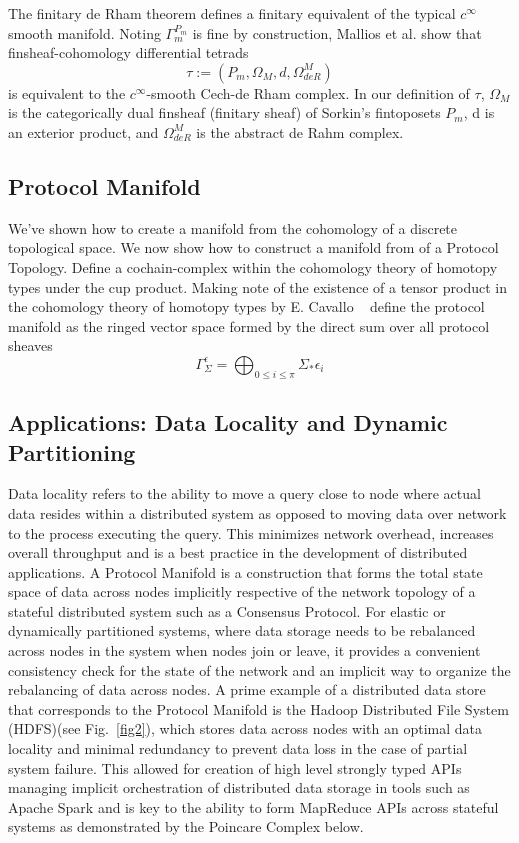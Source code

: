 \documentclass[runningheads]{llncs}
\begin{document}
The finitary de Rham theorem defines a finitary equivalent of the typical $c^{\infty}$ smooth manifold. Noting $\Gamma^{P_m}_m$ is fine by construction, Mallios et al. show that finsheaf-cohomology differential tetrads
\begin{equation}
\tau := (P_m, \Omega_M, d, \Omega^M_{deR})
\end{equation}
is equivalent to the $c^{\infty}$-smooth Cech-de Rham complex. In our definition of $\tau$, $\Omega_M$ is the categorically dual finsheaf (finitary sheaf) of Sorkin's  fintoposets $P_m$, d is an exterior product, and $ \Omega^M_{deR}$ is the abstract de Rahm complex.

\subsection{Protocol Manifold}
We've shown how to create a manifold from the cohomology of a discrete topological space. We now show how to construct a manifold from of a Protocol Topology. Define a cochain-complex within the cohomology theory of homotopy types under the cup product. Making note of the existence of a tensor product in the cohomology theory of homotopy types by E. Cavallo ~\cite{ref_article9} define the protocol manifold as the ringed vector space formed by the direct sum over all protocol sheaves
\begin{equation}
\Gamma^\epsilon_{\Sigma} = \bigoplus_{0 \leq i \leq \pi} \Sigma_* \epsilon_i
\end{equation}

\subsection{Applications: Data Locality and Dynamic Partitioning}
Data locality refers to the ability to move a query close to node where actual data resides within a distributed system as opposed to moving data over network to the process executing the query. This minimizes network overhead, increases overall throughput and is a best practice in the development of distributed applications. A Protocol Manifold is a construction that forms the total state space of data across nodes implicitly respective of the network topology of a stateful distributed system such as a Consensus Protocol. For elastic or dynamically partitioned systems, where data storage needs to be rebalanced across nodes in the system when nodes join or leave, it provides a convenient consistency check for the state of the network and an implicit way to organize the rebalancing of data across nodes. A prime example of a distributed data store that corresponds to the Protocol Manifold is the Hadoop Distributed File System (HDFS)(see Fig.~\ref{fig2}), which stores data across nodes with an optimal data locality and minimal redundancy to prevent data loss in the case of partial system failure. This allowed for creation of high level strongly typed APIs managing implicit orchestration of distributed data storage in tools such as Apache Spark and is key to the ability to form MapReduce APIs across stateful systems as demonstrated by the Poincare Complex below.
\end{document}
